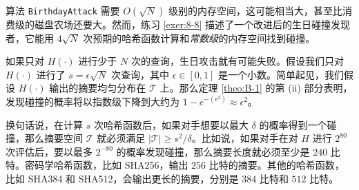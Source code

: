 \begin{snote}[变体。]
算法 \texttt{BirthdayAttack} 需要 $O(\sqrt{N})$ 级别的内存空间，这可能相当大，甚至比消费级的磁盘农场还要大。然而，练习 \ref{exer:8-8} 描述了一个改进后的生日碰撞发现者，它能用 $4\sqrt{N}$ 次预期的哈希函数计算和\emph{常数级}的内存空间找到碰撞。

如果只对 $H(\cdot)$ 进行少于 $N$ 次的查询，生日攻击就有可能失败。假设我们只对 $H(\cdot)$ 进行了 $s=\epsilon\sqrt{N}$ 次查询，其中 $\epsilon\in[0,1]$ 是一个小数。简单起见，我们假设 $H(\cdot)$ 输出的摘要均匀分布在 $\mathcal{T}$ 上。那么定理 \ref{theo:B-1} 的第 (ii) 部分表明，发现碰撞的概率将以指数级下降到大约为 $1-e^{-(\epsilon^2)}\approx\epsilon^2$。

换句话说，在计算 $s$ 次哈希函数后，如果对手想要以最大 $\delta$ 的概率得到一个碰撞，那么摘要空间 $\mathcal{T}$ 就必须满足 $|\mathcal{T}|\geq s^2/\delta$。比如说，如果对手在对 $H$ 进行 $2^80$ 次评估后，要以最多 $2^{-80}$ 的概率发现碰撞，那么摘要长度就必须至少是 $240$ 比特。密码学哈希函数，比如 SHA256，输出 $256$ 比特的摘要。其他的哈希函数，比如 SHA384 和 SHA512，会输出更长的摘要，分别是 $384$ 比特和 $512$ 比特。
\end{snote}
